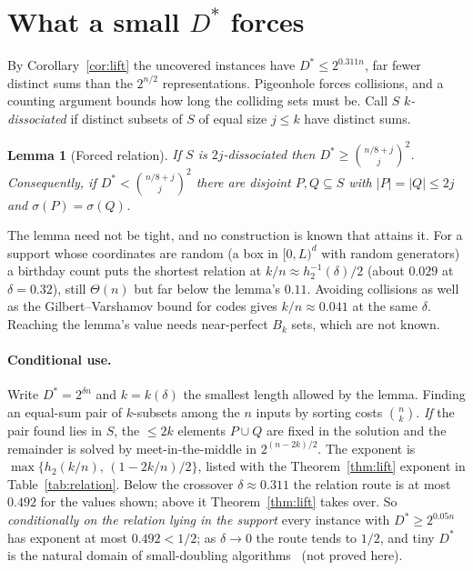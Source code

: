 \documentclass[conference]{IEEEtran}
\newtheorem{lemma}{Lemma}
\begin{document}
\section{What a small $D^*$ forces}\label{sec:relation}
By Corollary~\ref{cor:lift} the uncovered instances have $D^*\le2^{0.311n}$, far
fewer distinct sums than the $2^{n/2}$ representations. Pigeonhole forces
collisions, and a counting argument bounds how long the colliding sets must be.
Call $S$ \emph{$k$-dissociated} if distinct subsets of $S$ of equal size
$j\le k$ have distinct sums.

\begin{lemma}[Forced relation]\label{lem:relation}
If $S$ is $2j$-dissociated then $D^*\ge\binom{n/8+j}{j}^2$. Consequently, if
$D^*<\binom{n/8+j}{j}^2$ there are disjoint $P,Q\subseteq S$ with
$|P|=|Q|\le 2j$ and $\sigma(P)=\sigma(Q)$.
\end{lemma}

The lemma need not be tight, and no construction is known that attains it. For a support
whose coordinates are random (a box in $[0,L)^d$ with random generators) a birthday count
puts the shortest relation at $k/n\approx h_2^{-1}(\delta)/2$ (about $0.029$ at
$\delta=0.32$), still $\Theta(n)$ but far below the lemma's $0.11$. Avoiding collisions
as well as the Gilbert--Varshamov bound for codes gives $k/n\approx0.041$ at the same
$\delta$. Reaching the lemma's value needs near-perfect $B_k$ sets, which are not known.

\paragraph*{Conditional use.}
Write $D^*=2^{\delta n}$ and $k=k(\delta)$ the smallest length allowed by the
lemma. Finding an equal-sum pair of $k$-subsets among the $n$ inputs by sorting costs
$\binom nk$. \emph{If} the pair found lies in $S$, the $\le 2k$ elements
$P\cup Q$ are fixed in the solution and the remainder is solved by
meet-in-the-middle in $2^{(n-2k)/2}$. The exponent is
$\max\{h_2(k/n),\,(1-2k/n)/2\}$, listed with the Theorem~\ref{thm:lift} exponent in
Table~\ref{tab:relation}. Below the crossover $\delta\approx0.311$ the relation route
is at most $0.492$ for the values shown; above it Theorem~\ref{thm:lift} takes over.
So \emph{conditionally on the relation lying in the support} every instance with
$D^*\ge2^{0.05n}$ has exponent at most $0.492<1/2$; as $\delta\to0$ the route
tends to $1/2$, and tiny $D^*$ is the natural domain of small-doubling
algorithms~\cite{rwdoubling} (not proved here).
\end{document}
